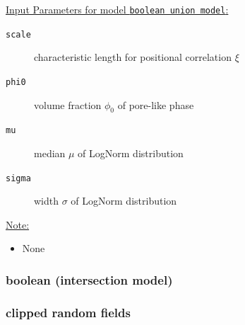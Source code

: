 \underline{Input Parameters for model \texttt{boolean union model}:}\\
\begin{description}
\item[\texttt{scale}] characteristic length for positional correlation $\xi$
\item[\texttt{phi0}] volume fraction $\phi_0$ of pore-like phase
\item[\texttt{mu}] median $\mu$ of LogNorm distribution
\item[\texttt{sigma}] width $\sigma$ of LogNorm distribution
\end{description}

\vspace{5mm}

\underline{Note:}
\begin{itemize}
\item None
\end{itemize}

\newpage
\subsubsection{boolean (intersection model)}

\newpage
\subsubsection{clipped random fields} ~\\

